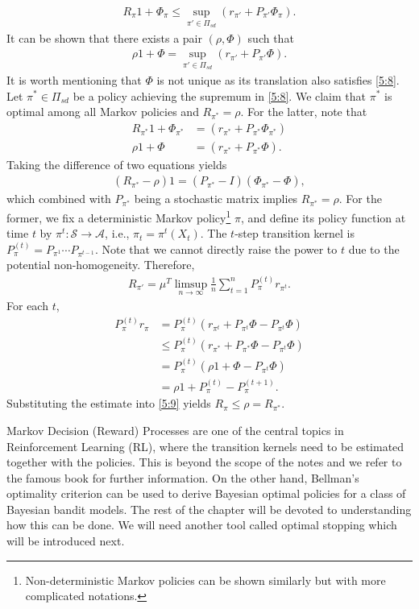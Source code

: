 \documentclass[letterpaper,11pt,openright,openany]{book}
\numberwithin{equation}{section}
\theoremstyle{plain}
\theoremstyle{definition}
\def\S{{\mathcal S}}
\def\A{{\mathcal A}}
\begin{document}
\begin{align}
R_\pi 1+\Phi_\pi \leq \sup_{\pi'\in\Pi_{sd}}\left(r_{\pi'} + P_{\pi'}\Phi_{\pi}\right).\label{5:7}
\end{align}
It can be shown that there exists a pair $(\rho, \Phi)$ such that
\begin{align}
\rho 1+\Phi = \sup_{\pi'\in\Pi_{sd}}\left(r_{\pi'} + P_{\pi'}\Phi\right).\label{5:8}
\end{align}
It is worth mentioning that $\Phi$ is not unique as its translation also satisfies \eqref{5:8}.
Let $\pi^*\in\Pi_{sd}$ be a policy achieving the supremum in \eqref{5:8}.
We claim that $\pi^*$ is optimal among all Markov policies and $R_{\pi^*}=\rho$.
For the latter, note that 
\begin{align*}
R_{\pi^*} 1+\Phi_{\pi^*}&=\left(r_{\pi^*} + P_{\pi^*}\Phi_{\pi^*}\right)\\
\rho 1+\Phi&=\left(r_{\pi^*} + P_{\pi^*}\Phi\right).
\end{align*}
Taking the difference of two equations yields
\begin{align*}
(R_{\pi^*}-\rho)1 = (P_{\pi^*}-I)(\Phi_{\pi^*}-\Phi),
\end{align*}
which combined with $P_{\pi^*}$ being a stochastic matrix implies $R_{\pi^*}=\rho$. 
For the former, we fix a deterministic Markov policy\footnote{Non-deterministic Markov policies can be shown similarly but with more complicated notations.} $\pi$, and define its policy function at time $t$ by $\pi^t:\S\to\A$, i.e., $\pi_t = \pi^t(X_t)$.  
The $t$-step transition kernel is $P_\pi^{(t)}=P_{\pi^1}\cdots P_{\pi^{t-1}}$. 
Note that we cannot directly raise the power to $t$ due to the potential non-homogeneity. Therefore, 
\begin{align}
R_{\pi'} = \mu^T\limsup_{n\to\infty}\frac{1}{n}\sum_{t=1}^{n}P^{(t)}_\pi r_{\pi^t}. \label{5:9}
\end{align} 
For each $t$,
\begin{align*}
P^{(t)}_\pi r_\pi&=P^{(t)}_\pi (r_{\pi^t}+P_{\pi^t}\Phi-P_{\pi^t}\Phi)\\
&\leq P^{(t)}_\pi (r_{\pi^*}+P_{\pi^*}\Phi-P_{\pi^t}\Phi)\\
& = P^{(t)}_\pi (\rho 1+\Phi-P_{\pi^t}\Phi)\\
& = \rho 1 + P^{(t)}_\pi-P^{(t+1)}_\pi.
\end{align*}
Substituting the estimate into \eqref{5:9} yields $R_\pi\leq\rho=R_{\pi^*}$.

Markov Decision (Reward) Processes are one of the central topics in Reinforcement Learning (RL), where the transition kernels need to be estimated together with the policies. 
This is beyond the scope of the notes and we refer to the famous book \cite{sutton2018reinforcement} for further information.  
On the other hand, Bellman's optimality criterion can be used to derive Bayesian optimal policies for a class of Bayesian bandit models. 
The rest of the chapter will be devoted to understanding how this can be done. We will need another tool called optimal stopping which will be introduced next.    
\end{document}
